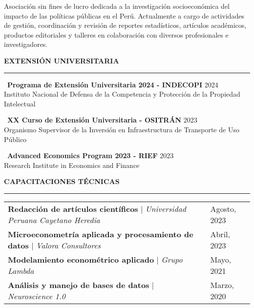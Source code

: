 \documentclass{resume2}
\begin{document}
\noindent Asociación sin fines de lucro dedicada a la investigación socioeconómica del impacto de las políticas públicas en el Perú.
Actualmente a cargo de actividades de gestión, coordinación y revisión de reportes estadísticos,
artículos académicos, productos editoriales y talleres en colaboración con diversos profesionales e investigadores.

\vspace{5mm}


{\color{vino} \noindent\MakeUppercase{\large \bf Extensión Universitaria} \\
\rule[3mm]{\textwidth}{0.5mm}}

\noindent {\color{vino} \faMortarBoard} \, {\bf Programa de Extensión Universitaria 2024 - INDECOPI} \hfill
{\color{vino}\faCalendarCheckO} {2024} \\
{\color{vino} \faInstitution} \; {Instituto Nacional de Defensa de la Competencia y Protección de la Propiedad Intelectual}

\vspace{5mm}

\noindent {\color{vino} \faMortarBoard} \, {\bf XX Curso de Extensión Universitaria - OSITRÁN} \hfill
{\color{vino}\faCalendarCheckO} {2023} \\
{\color{vino}\faInstitution} \; {Organismo Supervisor de la Inversión en Infraestructura de Transporte de Uso Público}

\vspace{5mm}

\noindent {\color{vino}\faMortarBoard} \, {\bf Advanced Economics Program 2023 - RIEF} \hfill
{\color{vino}\faCalendarCheckO} {2023} \\
{\color{vino}\faInstitution} \; {Research Institute in Economics and Finance}

\vspace{5mm}


{\color{vino} \noindent\MakeUppercase{\large \bf Capacitaciones Técnicas} \\
\rule[3mm]{\textwidth}{0.5mm}}

\vspace{-3mm}

\begin{table}[H]
	\begin{tabular}{lll}
		{\bf Redacción de artículos científicos} $|$ {\it Universidad Peruana Cayetano Heredia} & \hspace{7.5mm} & {\color{vino}\faCalendarCheckO} {Agosto, 2023} \\
		{\bf Microeconometría aplicada y procesamiento de datos} $|$ {\it Valora Consultores} &  & {\color{vino}\faCalendarCheckO} {Abril, 2023} \\
		{\bf Modelamiento econométrico aplicado} $|$ {\it Grupo Lambda} &  & {\color{vino}\faCalendarCheckO} {Mayo, 2021} \\
		{\bf Análisis y manejo de bases de datos} $|$ {\it Neuroscience 1.0} &  & {\color{vino}\faCalendarCheckO} {Marzo, 2020}
	\end{tabular}
\end{table}
\end{document}

